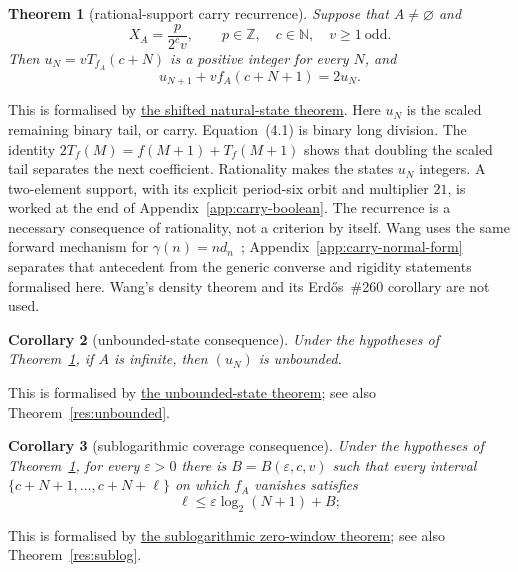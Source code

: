\documentclass[11pt]{article}
\newcommand{\commit}{312b96c0d149ed466725c62d4ef24cfc91bca34e}
\newcommand{\repobase}{https://github.com/wcook04/plectis-lean-erdos249-257/blob/\commit}
\newcommand{\PK}{Erdos249257}
\newcommand{\lword}[4]{\href{\repobase/\PK/#1\#L#2}{#4}}
\newtheorem{theorem}{Theorem}[section]
\newtheorem{corollary}[theorem]{Corollary}
\theoremstyle{definition}
\theoremstyle{remark}
\newcommand{\N}{\mathbb{N}}
\newcommand{\Z}{\mathbb{Z}}
\begin{document}
\begin{theorem}[rational-support carry recurrence]\label{res:rigidity-main}
Suppose that \(A\neq\varnothing\) and
\[
 X_A=\frac{p}{2^c v},
 \qquad p\in\Z,\quad c\in\N,\quad v\geq1\ \text{odd}.
\]
Then \(u_N=vT_{f_A}(c+N)\) is a positive integer for every \(N\), and
\[
 u_{N+1}+v f_A(c+N+1)=2u_N. \tag{4.1}
\]
\end{theorem}
\noindent This is formalised by
\lword{RationalSupportCarrySkeleton.lean}{668}{exists_shifted_odd_tail_nat_states_of_support_fraction}{the shifted natural-state theorem}.
Here \(u_N\) is the scaled remaining binary tail, or carry.
Equation~\textup{(4.1)} is binary long division.  The identity
\(2T_f(M)=f(M+1)+T_f(M+1)\) shows that doubling the scaled tail separates the
next coefficient.  Rationality makes the states \(u_N\) integers.
A two-element
support, with its explicit period-six orbit and multiplier \(21\), is worked
at the end of Appendix~\ref{app:carry-boolean}.
The recurrence is a necessary consequence of rationality, not a criterion by
itself.  Wang uses the same forward mechanism for
\(\gamma(n)=n d_n\)~\cite[Section~3]{wang2026}; Appendix~\ref{app:carry-normal-form}
separates that antecedent from the generic converse and rigidity statements
formalised here.  Wang's density theorem and its Erd\H{o}s~\#260 corollary
are not used.

\begin{corollary}[unbounded-state consequence]
\label{res:rigidity-unbounded-main}
Under the hypotheses of Theorem~\ref{res:rigidity-main}, if \(A\) is
infinite, then \((u_N)\) is unbounded.
\end{corollary}
\noindent This is formalised by
\lword{RationalSupportCarrySkeleton.lean}{2377}{exists_unbounded_shifted_odd_tail_nat_state_of_support_fraction}{the unbounded-state theorem};
see also Theorem~\ref{res:unbounded}.

\begin{corollary}[sublogarithmic coverage consequence]
\label{res:rigidity-sublog-main}
Under the hypotheses of Theorem~\ref{res:rigidity-main}, for every
\(\varepsilon>0\) there is
\(B=B(\varepsilon,c,v)\) such that every interval
\(\{c+N+1,\ldots,c+N+\ell\}\) on which \(f_A\) vanishes satisfies
\[
 \ell\leq\varepsilon\log_2(N+1)+B;
\]
\end{corollary}
\noindent This is formalised by
\lword{SublogDivisorCoverage.lean}{392}{supportCoeffZeroWindow_length_le_eps_logb_add}{the sublogarithmic zero-window theorem};
see also Theorem~\ref{res:sublog}.
\end{document}
